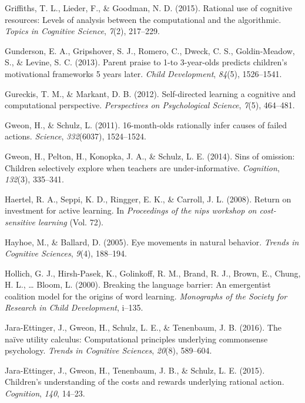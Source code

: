 \documentclass[oneside]{report}
\begin{document}
\hypertarget{ref-griffiths2015rational}{}
Griffiths, T. L., Lieder, F., \& Goodman, N. D. (2015). Rational use of
cognitive resources: Levels of analysis between the computational and
the algorithmic. \emph{Topics in Cognitive Science}, \emph{7}(2),
217--229.

\hypertarget{ref-gunderson2013parent}{}
Gunderson, E. A., Gripshover, S. J., Romero, C., Dweck, C. S.,
Goldin-Meadow, S., \& Levine, S. C. (2013). Parent praise to 1-to
3-year-olds predicts children's motivational frameworks 5 years later.
\emph{Child Development}, \emph{84}(5), 1526--1541.

\hypertarget{ref-gureckis2012self}{}
Gureckis, T. M., \& Markant, D. B. (2012). Self-directed learning a
cognitive and computational perspective. \emph{Perspectives on
Psychological Science}, \emph{7}(5), 464--481.

\hypertarget{ref-gweon201116}{}
Gweon, H., \& Schulz, L. (2011). 16-month-olds rationally infer causes
of failed actions. \emph{Science}, \emph{332}(6037), 1524--1524.

\hypertarget{ref-gweon2014sins}{}
Gweon, H., Pelton, H., Konopka, J. A., \& Schulz, L. E. (2014). Sins of
omission: Children selectively explore when teachers are
under-informative. \emph{Cognition}, \emph{132}(3), 335--341.

\hypertarget{ref-haertel2008return}{}
Haertel, R. A., Seppi, K. D., Ringger, E. K., \& Carroll, J. L. (2008).
Return on investment for active learning. In \emph{Proceedings of the
nips workshop on cost-sensitive learning} (Vol. 72).

\hypertarget{ref-hayhoe2005eye}{}
Hayhoe, M., \& Ballard, D. (2005). Eye movements in natural behavior.
\emph{Trends in Cognitive Sciences}, \emph{9}(4), 188--194.

\hypertarget{ref-hollich2000breaking}{}
Hollich, G. J., Hirsh-Pasek, K., Golinkoff, R. M., Brand, R. J., Brown,
E., Chung, H. L., \ldots{} Bloom, L. (2000). Breaking the language
barrier: An emergentist coalition model for the origins of word
learning. \emph{Monographs of the Society for Research in Child
Development}, i--135.

\hypertarget{ref-jara2016naive}{}
Jara-Ettinger, J., Gweon, H., Schulz, L. E., \& Tenenbaum, J. B. (2016).
The naïve utility calculus: Computational principles underlying
commonsense psychology. \emph{Trends in Cognitive Sciences},
\emph{20}(8), 589--604.

\hypertarget{ref-jara2015children}{}
Jara-Ettinger, J., Gweon, H., Tenenbaum, J. B., \& Schulz, L. E. (2015).
Children's understanding of the costs and rewards underlying rational
action. \emph{Cognition}, \emph{140}, 14--23.
\end{document}
